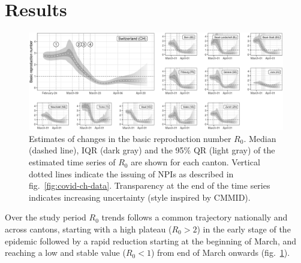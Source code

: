 \section{Results}
\begin{figure}\centering
  \includegraphics[width=\textwidth]{fig_covid-switzerland-npi/FIGURE_2.png}
  \caption[Estimates of changes in the basic reproduction number $R_0$.]{Estimates of changes in the basic reproduction number $R_0$. Median (dashed line), IQR (dark gray) and the 95\% QR (light gray) of the estimated time series of $R_0$ are shown for each canton. Vertical dotted lines indicate the issuing of NPIs as described in fig.~\ref{fig:covid-ch-data}. Transparency at the end of the time series indicates increasing uncertainty (style inspired by CMMID).}
  \label{fig:covid-ch-r0}
\end{figure}
Over the study period $R_0$ trends follows a common trajectory nationally and across cantons, starting with a high plateau ($R_0 >2$) in the early stage of the epidemic followed by a rapid reduction starting at the beginning of March, and reaching a low and stable value ($R_0 <1$) from end of March onwards (fig.~\ref{fig:covid-ch-r0}). 

